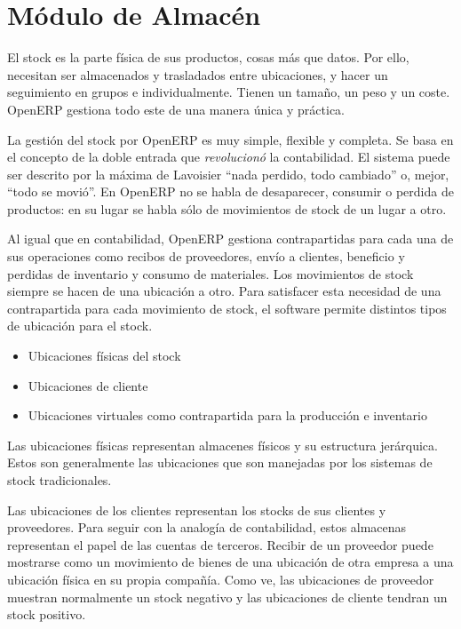 %
%
%
%


\chapter{Módulo de Almacén}
\label{moduloAlmacen}
El stock es la parte física de sus productos, cosas más que datos. Por ello, necesitan ser almacenados y trasladados entre ubicaciones, y hacer un seguimiento en grupos e individualmente. Tienen un tamaño, un peso y un coste. OpenERP gestiona todo este de una manera única y práctica.

La gestión del stock por OpenERP es muy simple, flexible y completa. Se basa en el concepto de la doble entrada que \emph{revolucionó} la contabilidad. El sistema puede ser descrito por la máxima de Lavoisier “nada perdido, todo cambiado” o, mejor, “todo  se movió”. En OpenERP no se habla de desaparecer, consumir o perdida de productos: en su lugar se habla sólo de movimientos de stock de un lugar a otro.


Al igual que en contabilidad, OpenERP gestiona contrapartidas para cada una de sus operaciones como recibos de proveedores, envío a clientes, beneficio y perdidas de inventario y consumo de materiales. Los movimientos de stock siempre se hacen de una ubicación a otro. Para satisfacer esta necesidad de una contrapartida para cada movimiento de stock, el software permite distintos tipos de ubicación para el stock.

\begin{itemize}
\item Ubicaciones físicas del stock
\item Ubicaciones de cliente
\item Ubicaciones virtuales como contrapartida para la producción e inventario
\end{itemize}

Las ubicaciones físicas representan almacenes físicos y su estructura jerárquica. Estos son generalmente las ubicaciones que son manejadas por los sistemas de stock tradicionales.

Las ubicaciones de los clientes representan los stocks de sus clientes y proveedores. Para seguir con la analogía de contabilidad, estos almacenas representan el papel de las cuentas de terceros. Recibir de un proveedor puede mostrarse como un movimiento de bienes de una ubicación de otra empresa a una ubicación física en su propia compañía. Como ve, las ubicaciones de proveedor muestran normalmente un stock negativo y las ubicaciones de cliente tendran un stock positivo.


